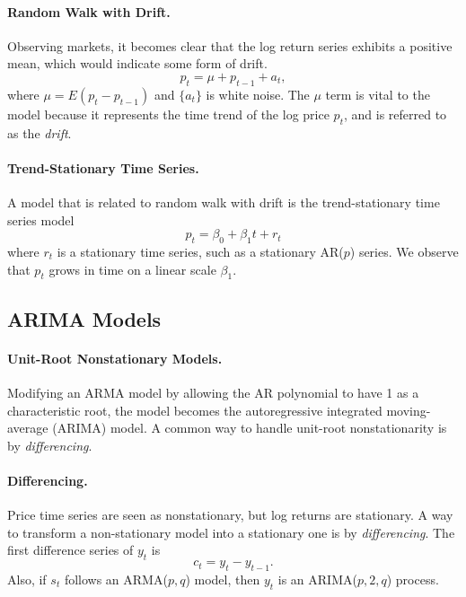 \paragraph{Random Walk with Drift.} Observing markets, it becomes clear that the log return series exhibits a positive mean, which would indicate some form of drift.
\begin{equation}
p_t = \mu +p_{t-1} + a_t,
\end{equation}
where $\mu=E(p_t - p_{t-1})$ and $\{a_t\}$ is white noise. The $\mu$ term is vital to the model because it represents the time trend of the log price $p_t$, and is referred to as the \emph{drift}.

\paragraph{Trend-Stationary Time Series.}
A model that is related to random walk with drift is the trend-stationary time series model
\[
p_t = \beta_0 + \beta_1 t+r_t
\]
where $r_t$ is a stationary time series, such as a stationary AR($p$) series. We observe that $p_t$ grows in time on a linear scale $\beta_1$.

\subsection{ARIMA Models}\label{ARMIA models}
\paragraph{Unit-Root Nonstationary Models.}
Modifying an ARMA model by allowing the AR polynomial to have 1 as a characteristic root, the model becomes the autoregressive integrated moving-average (ARIMA) model. A common way to handle unit-root nonstationarity is by \emph{differencing}.

\paragraph{Differencing.} Price time series are seen as nonstationary, but log returns are stationary. A way to transform a non-stationary model into a stationary one is by \emph{differencing}. The first difference series of $y_t$ is
\[
c_t = y_t - y_{t-1}.
\]
Also, if $s_t$ follows an ARMA($p,q$) model, then $y_t$ is an ARIMA($p,2,q$) process.

